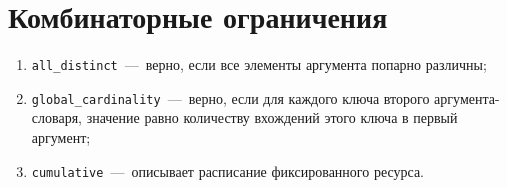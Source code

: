 \section{Комбинаторные ограничения}
\begin{enumerate}
	\item \texttt{all\_distinct}~---~верно, если все элементы аргумента попарно различны;
	\item \texttt{global\_cardinality}~---~верно, если для каждого ключа второго аргумента-словаря, значение равно количеству вхождений этого ключа в первый аргумент;
	\item \texttt{cumulative}~---~описывает расписание фиксированного ресурса.
	\end{enumerate}
